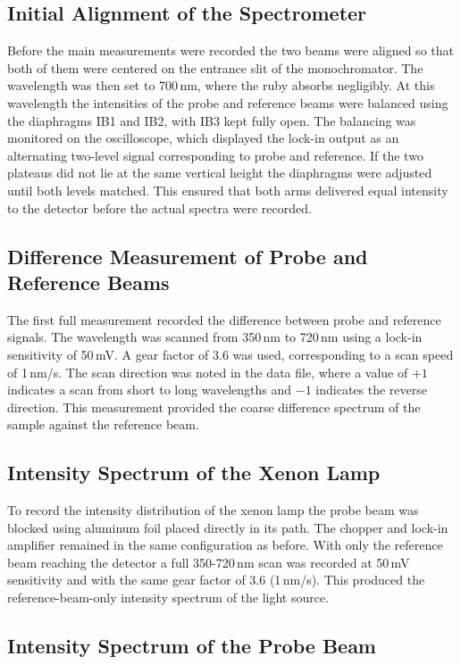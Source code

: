 \documentclass[a4paper]{article}
\begin{document}
\subsection{Initial Alignment of the Spectrometer}

Before the main measurements were recorded the two beams were aligned so that both of them were centered on the entrance slit of the monochromator.
The wavelength was then set to 700\,nm, where the ruby absorbs negligibly.
At this wavelength the intensities of the probe and reference beams were balanced using the diaphragms IB1 and IB2, with IB3 kept fully open.
The balancing was monitored on the oscilloscope, which displayed the lock-in output as an alternating two-level signal corresponding to probe and reference.
If the two plateaus did not lie at the same vertical height the diaphragms were adjusted until both levels matched.
This ensured that both arms delivered equal intensity to the detector before the actual spectra were recorded.

\subsection{Difference Measurement of Probe and Reference Beams}

The first full measurement recorded the difference between probe and reference signals.
The wavelength was scanned from 350\,nm to 720\,nm using a lock-in sensitivity of 50\,mV.
A gear factor of 3.6 was used, corresponding to a scan speed of 1\,nm/s.
The scan direction was noted in the data file, where a value of $+1$ indicates a scan from short to long wavelengths and $-1$ indicates the reverse direction.
This measurement provided the coarse difference spectrum of the sample against the reference beam.

\subsection{Intensity Spectrum of the Xenon Lamp}

To record the intensity distribution of the xenon lamp the probe beam was blocked using aluminum foil placed directly in its path.
The chopper and lock-in amplifier remained in the same configuration as before.
With only the reference beam reaching the detector a full 350-720\,nm scan was recorded at 50\,mV sensitivity and with the same gear factor of 3.6 (1\,nm/s).
This produced the reference-beam-only intensity spectrum of the light source.

\subsection{Intensity Spectrum of the Probe Beam}
\end{document}
